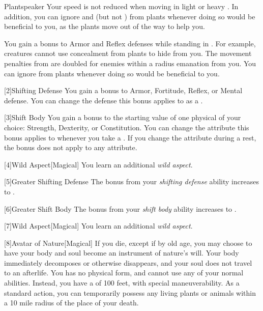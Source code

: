 {            \begin{freeability}{Plantspeaker}
                Your speed is not reduced when moving in light or heavy .
                In addition, you can ignore  and  (but not ) from plants whenever doing so would be beneficial to you, as the plants move out of the way to help you.

                \rankline
                 You gain a  bonus to Armor and Reflex defenses while standing in .
                For example, creatures cannot use concealment from plants to hide from you.
                 The movement penalties from  are doubled for enemies within a \areahuge radius emanation from you.
                 You can ignore  from plants whenever doing so would be beneficial to you.
            \end{freeability}
        }

        [2]{Shifting Defense} You gain a  bonus to Armor, Fortitude, Reflex, or Mental defense.
        You can change the defense this bonus applies to as a .

        [3]{Shift Body} You gain a  bonus to the starting value of one physical  of your choice: Strength, Dexterity, or Constitution.
        You can change the attribute this bonus applies to whenever you take a .
        If you change the attribute during a rest, the bonus does not apply to any attribute.

        [4]{Wild Aspect}[Magical]
        You learn an additional \textit{wild aspect}.

        [5]{Greater Shifting Defense}
        The bonus from your \textit{shifting defense} ability increases to .

        [6]{Greater Shift Body}
        The bonus from your \textit{shift body} ability increases to .

        [7]{Wild Aspect}[Magical]
        You learn an additional \textit{wild aspect}.

        [8]{Avatar of Nature}[Magical]
        If you die, except if by old age, you may choose to have your body and soul become an instrument of nature's will.
        Your body immediately decomposes or otherwise disappears, and your soul does not travel to an afterlife.
        You has no physical form, and cannot use any of your normal abilities.
        Instead, you have a  of 100 feet, with special maneuverability.
        As a standard action, you can temporarily possess any living plants or animals within a 10 mile radius of the place of your death.

